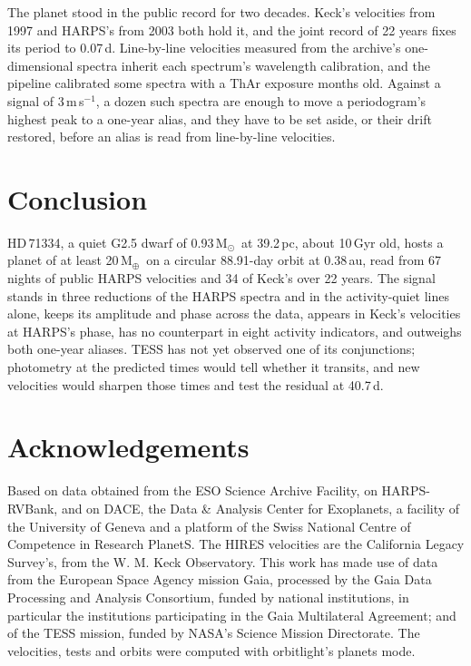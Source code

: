 \documentclass[3p,11pt]{elsarticle}
\newcommand{\ms}{m\,s$^{-1}$}
\newcommand{\Msun}{M$_\odot$}
\newcommand{\Mearth}{M$_\oplus$}
\begin{document}
The planet stood in the public record for two decades. Keck's velocities from 1997 and HARPS's from
2003 both hold it, and the joint record of 22 years fixes its period to 0.07\,d. Line-by-line
velocities measured from the archive's one-dimensional spectra inherit each spectrum's wavelength
calibration, and the pipeline calibrated some spectra with a ThAr exposure months old. Against a
signal of 3\,\ms, a dozen such spectra are enough to move a periodogram's highest peak to a one-year
alias, and they have to be set aside, or their drift restored, before an alias is read from
line-by-line velocities.

\section{Conclusion}\label{sec:conclusion}

HD\,71334, a quiet G2.5 dwarf of 0.93\,\Msun\ at 39.2\,pc, about 10\,Gyr old, hosts a planet of at least
20\,\Mearth\ on a circular 88.91-day orbit at 0.38\,au, read from 67 nights of public HARPS velocities
and 34 of Keck's over 22 years. The signal stands in three reductions of the HARPS spectra and in the
activity-quiet lines alone, keeps its amplitude and phase across the data, appears in Keck's velocities
at HARPS's phase, has no counterpart in eight activity indicators, and outweighs both one-year aliases.
TESS has not yet observed one of its conjunctions; photometry at the predicted times would tell
whether it transits, and new velocities would sharpen those times and test the residual at 40.7\,d.

\section*{Acknowledgements}

Based on data obtained from the ESO Science Archive Facility, on HARPS-RVBank, and on DACE, the Data \&
Analysis Center for Exoplanets, a facility of the University of Geneva and a platform of the Swiss
National Centre of Competence in Research PlanetS. The HIRES velocities are the California Legacy
Survey's, from the W. M. Keck Observatory. This work has made use of data from the European Space Agency
mission Gaia, processed by the Gaia Data Processing and Analysis Consortium, funded by national
institutions, in particular the institutions participating in the Gaia Multilateral Agreement; and of
the TESS mission, funded by NASA's Science Mission Directorate. The velocities, tests and orbits were
computed with orbitlight's planets mode.
\end{document}
